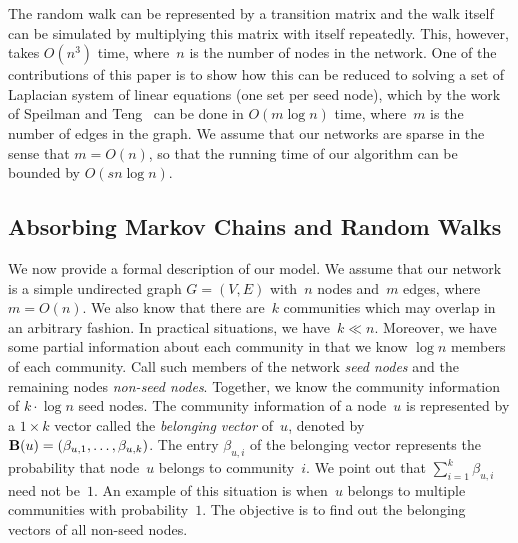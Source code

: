 The random walk can be represented by a transition matrix and the walk itself can be simulated 
by multiplying this matrix with itself repeatedly. This, however, takes $O(n^3)$
time, where~$n$ is the number of nodes in the network. One of the contributions of 
this paper is to show how this can be reduced to solving a set of Laplacian system 
of linear equations (one set per seed node), which by the work of Speilman and 
Teng~\cite{Vis13} can be done in $O(m \log n)$ time, where~$m$ is the number of edges
in the graph. We assume that our networks are sparse in the sense that $m = O(n)$, 
so that the running time of our algorithm can  be bounded by $O(s n \log n)$.    
        
\subsection{Absorbing Markov Chains and Random Walks}
We now provide a formal description of our model. We assume that our network 
is a simple undirected graph $G = (V,E)$ with~$n$ nodes and~$m$ edges, where $m = O(n)$.
We also know that there are~$k$ communities which may overlap in an arbitrary fashion.
In practical situations, we have~$k \ll n$. 
Moreover, we have some partial information about each community in that we know
$\log n$ members of each community. Call such members of the network \emph{seed nodes} 
and the remaining nodes \emph{non-seed nodes}. Together, we know the community information 
of $k \cdot \log n$ seed nodes. The community information of a node~$u$ is represented 
by a $1 \times k$ vector called the \emph{belonging vector} of~$u$, denoted 
by~$\mathbf{B} (u) = (\beta_{u, 1}, \ldots, \beta_{u, k})$. The entry $\beta_{u, i}$ 
of the belonging vector represents the probability that node~$u$ belongs to community~$i$.  
We point out that $\sum_{i = 1}^k \beta_{u, i}$ need not be~$1$. An example of this situation 
is when~$u$ belongs to multiple communities with probability~$1$.
The objective is to find out the belonging vectors of all non-seed nodes. 

